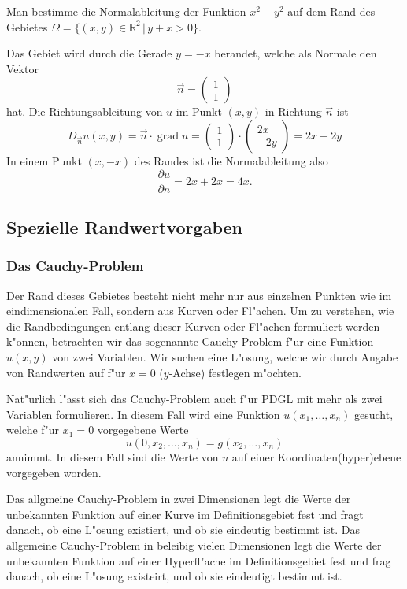 \begin{beispiel}
Man bestimme die Normalableitung der Funktion $x^2-y^2$ auf dem Rand
des Gebietes $\Omega=\{(x,y)\in\mathbb R^2\,|\,y+x>0\}$.

Das Gebiet wird durch die Gerade $y=-x$ berandet, welche als Normale
den Vektor 
\[
\vec n=\begin{pmatrix}1\\1\end{pmatrix}
\]
hat. Die Richtungsableitung von $u$ im Punkt $(x,y)$ in Richtung $\vec n$
ist
\[
D_{\vec n}u(x,y)=\vec n\cdot\operatorname{grad}u
=\begin{pmatrix}1\\1\end{pmatrix}\cdot\begin{pmatrix}2x\\-2y\end{pmatrix}
=2x-2y
\]
In einem Punkt $(x,-x)$ des Randes ist die Normalableitung also
\[
\frac{\partial u}{\partial n}
=
2x+2x=4x.
\]
\end{beispiel}

\subsection{Spezielle Randwertvorgaben\label{klassifikation:randwerte-speziell}}
\subsubsection{Das Cauchy-Problem\label{klassifikation:cauchy-problem}}
Der Rand dieses Gebietes
besteht nicht mehr nur aus einzelnen Punkten wie im eindimensionalen
Fall, sondern aus Kurven oder Fl"achen. Um zu verstehen, wie die
Randbedingungen entlang dieser Kurven oder Fl"achen formuliert
werden k"onnen, betrachten
wir das sogenannte Cauchy-Problem f"ur eine Funktion $u(x,y)$ von
zwei Variablen. Wir suchen eine L"osung, welche wir durch Angabe
von Randwerten auf f"ur $x=0$ ($y$-Achse) festlegen m"ochten.

Nat"urlich l"asst sich das Cauchy-Problem auch f"ur PDGL mit mehr
als zwei Variablen formulieren. In diesem Fall wird eine Funktion
$u(x_1,\dots,x_n)$ gesucht, welche f"ur $x_1=0$ vorgegebene Werte
\[
u(0,x_2,\dots,x_n)=g(x_2,\dots,x_n)
\]
annimmt.
In diesem Fall sind die Werte von $u$ auf einer Koordinaten(hyper)ebene
vorgegeben worden.

Das allgmeine Cauchy-Problem in zwei Dimensionen legt die Werte der
unbekannten Funktion auf einer
Kurve im Definitionsgebiet fest und fragt danach, ob eine L"osung existiert, und
ob sie eindeutig bestimmt ist.
Das allgemeine Cauchy-Problem in beleibig vielen Dimensionen legt die
Werte der unbekannten Funktion auf einer Hyperfl"ache im Definitionsgebiet
fest und frag danach, ob eine L"osung existeirt,
und ob sie eindeutigt bestimmt ist.

